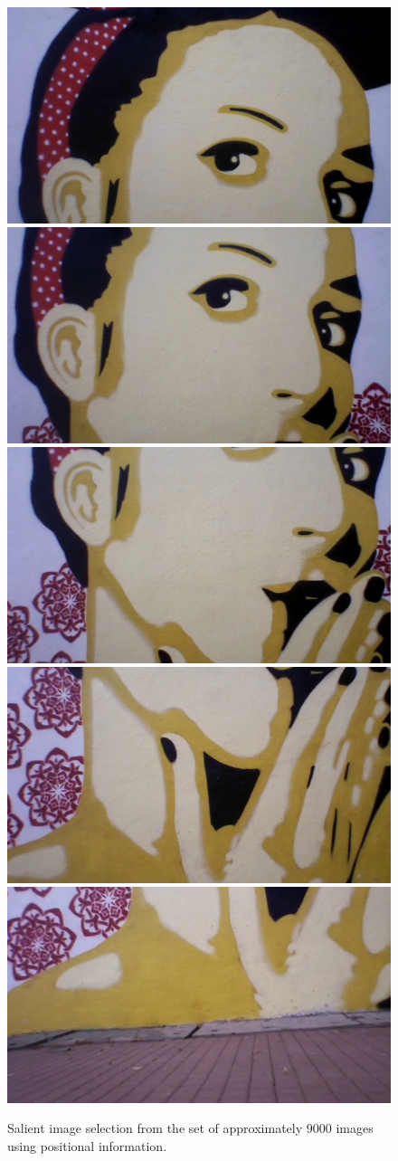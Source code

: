 \begin{figure}[htb!]
\centering
\includegraphics[width=0.19\linewidth]{figures/sac3/selected/1.jpg}
\includegraphics[width=0.19\linewidth]{figures/sac3/selected/5.jpg}
\includegraphics[width=0.19\linewidth]{figures/sac3/selected/4.jpg}
\includegraphics[width=0.19\linewidth]{figures/sac3/selected/2.jpg}
\includegraphics[width=0.19\linewidth]{figures/sac3/selected/3.jpg}
\caption{Salient image selection from the set of approximately 9000
  images using positional information.}
\label{fig:selected_sac3}
\end{figure}



